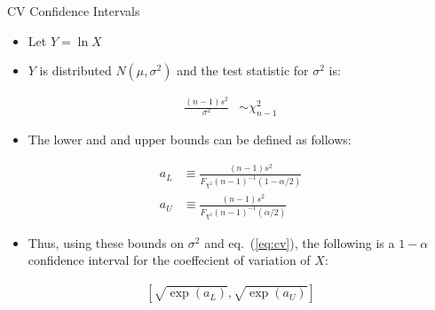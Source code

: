\documentclass{beamer}
\begin{document}
\begin{frame}{CV Confidence Intervals}
\begin{itemize}
	\item Let $Y=\ln X$
	\item $Y$ is distributed $N(\mu,\sigma^{2})$ and the test statistic for $\sigma^{2}$ is:
\end{itemize}
\begin{align}
\frac{(n-1)s^{2}}{\sigma^{2}} & \sim \chi^{2}_{n-1} \nonumber
\end{align}
\begin{itemize}
	\item The lower and and upper bounds can be defined as follows:
\end{itemize}
\begin{align*}
a_{L}&\equiv\frac{(n-1)s^{2}}{F_{\chi^{2}}(n-1)^{-1}(1-\alpha/2)}\\
a_{U}&\equiv\frac{(n-1)s^{2}}{F_{\chi^{2}}(n-1)^{-1}(\alpha/2)}
\end{align*}
\begin{itemize}
	\item Thus, using these bounds on $\sigma^{2}$ and eq.~(\ref{eq:cv}), the following is a $1-\alpha$ confidence interval for the coeffecient of variation of $X$:
\end{itemize}
\begin{align}
\left [ \sqrt{\exp(a_{L})},\sqrt{\exp(a_{U})} \right ] \nonumber
\end{align}
\end{frame}


\end{document}
